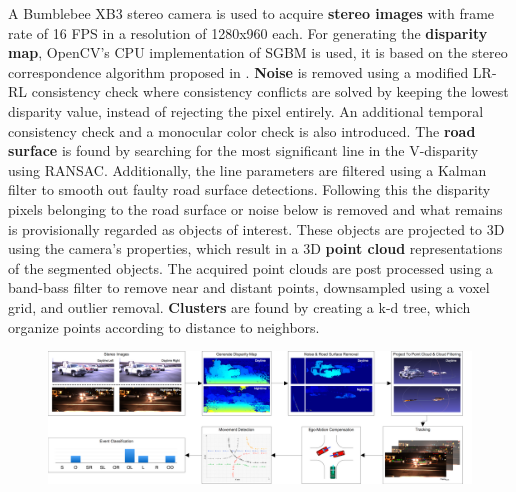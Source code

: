 \vspace*{-1.5mm}
\begin{multicols}{2}   
A Bumblebee XB3 stereo camera is used to acquire \textbf{stereo images} with frame rate of 16 FPS in a resolution of 1280x960 each. For generating the \textbf{disparity map}, OpenCV's CPU implementation of  SGBM is used, it is based on the stereo correspondence algorithm proposed in \cite{HirschmullerRLandSGBM}. \textbf{Noise} is removed using a modified LR-RL consistency check where consistency conflicts are solved by keeping the lowest disparity value, instead of rejecting the pixel entirely. An additional temporal consistency check and a monocular color check is also introduced.
The \textbf{road surface} is found by searching for the most significant line in the V-disparity \cite{labayrade2002real} using RANSAC. Additionally, the line parameters are filtered using a Kalman filter to smooth out faulty road surface detections. Following this the disparity pixels belonging to the road surface or noise below is removed and what remains is provisionally regarded as objects of interest. These objects are projected to 3D using the camera's properties, which result in a 3D \textbf{point cloud} representations of the segmented objects.
The acquired point clouds are post processed using a band-bass filter to remove near and distant points, downsampled using a voxel grid, and outlier removal. \textbf{Clusters} are found by creating a k-d tree, which organize points according to distance to neighbors. 
\end{multicols}

\begin{figure}[H]
  \centering
  \includegraphics[width=1\textwidth]{text/figures/methods/flowChart.png}
  \label{systemOverview::systemOverview}
\end{figure}

